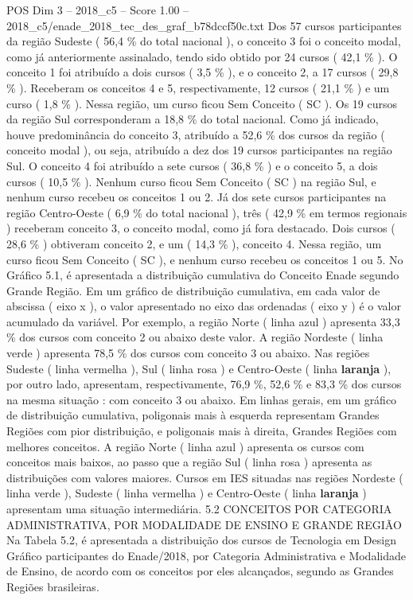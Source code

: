 \begin{textsample}{POS Dim 3 – 2018\_c5 – Score 1.00 – 2018\_c5/enade\_2018\_tec\_des\_graf\_b78dccf50c.txt}
Dos 57 cursos participantes da região Sudeste ( 56,4 \% do total nacional ), o conceito 3 foi o conceito modal, como já anteriormente assinalado, tendo sido obtido por 24 cursos ( 42,1 \% ).
O conceito 1 foi atribuído a dois cursos ( 3,5 \% ), e o conceito 2, a 17 cursos ( 29,8 \% ).
Receberam os conceitos 4 e 5, respectivamente, 12 cursos ( 21,1 \% ) e um curso ( 1,8 \% ).
Nessa região, um curso ficou Sem Conceito ( SC ).
Os 19 cursos da região Sul corresponderam a 18,8 \% do total nacional.
Como já indicado, houve predominância do conceito 3, atribuído a 52,6 \% dos cursos da região ( conceito modal ), ou seja, atribuído a dez dos 19 cursos participantes na região Sul.
O conceito 4 foi atribuído a sete cursos ( 36,8 \% ) e o conceito 5, a dois cursos ( 10,5 \% ).
Nenhum curso ficou Sem Conceito ( SC ) na região Sul, e nenhum curso recebeu os conceitos 1 ou 2.
Já dos sete cursos participantes na região Centro-Oeste ( 6,9 \% do total nacional ), três ( 42,9 \% em termos regionais ) receberam conceito 3, o conceito modal, como já fora destacado.
Dois cursos ( 28,6 \% ) obtiveram conceito 2, e um ( 14,3 \% ), conceito 4.
Nessa região, um curso ficou Sem Conceito ( SC ), e nenhum curso recebeu os conceitos 1 ou 5.
No Gráfico 5.1, é apresentada a distribuição cumulativa do Conceito Enade segundo Grande Região.
Em um gráfico de distribuição cumulativa, em cada valor de abscissa ( eixo x ), o valor apresentado no eixo das ordenadas ( eixo y ) é o valor acumulado da variável.
Por exemplo, a região Norte ( linha azul ) apresenta 33,3 \% dos cursos com conceito 2 ou abaixo deste valor.
A região Nordeste ( linha verde ) apresenta 78,5 \% dos cursos com conceito 3 ou abaixo.
Nas regiões Sudeste ( linha vermelha ), Sul ( linha rosa ) e Centro-Oeste ( linha \textbf{laranja} ), por outro lado, apresentam, respectivamente, 76,9 \%, 52,6 \% e 83,3 \% dos cursos na mesma situação : com conceito 3 ou abaixo.
Em linhas gerais, em um gráfico de distribuição cumulativa, poligonais mais à esquerda representam Grandes Regiões com pior distribuição, e poligonais mais à direita, Grandes Regiões com melhores conceitos.
A região Norte ( linha azul ) apresenta os cursos com conceitos mais baixos, ao passo que a região Sul ( linha rosa ) apresenta as distribuições com valores maiores.
Cursos em IES situadas nas regiões Nordeste ( linha verde ), Sudeste ( linha vermelha ) e Centro-Oeste ( linha \textbf{laranja} ) apresentam uma situação intermediária. 5.2 CONCEITOS POR CATEGORIA ADMINISTRATIVA, POR MODALIDADE DE ENSINO E GRANDE REGIÃO Na Tabela 5.2, é apresentada a distribuição dos cursos de Tecnologia em Design Gráfico participantes do Enade/2018, por Categoria Administrativa e Modalidade de Ensino, de acordo com os conceitos por eles alcançados, segundo as Grandes Regiões brasileiras.

\end{textsample}
